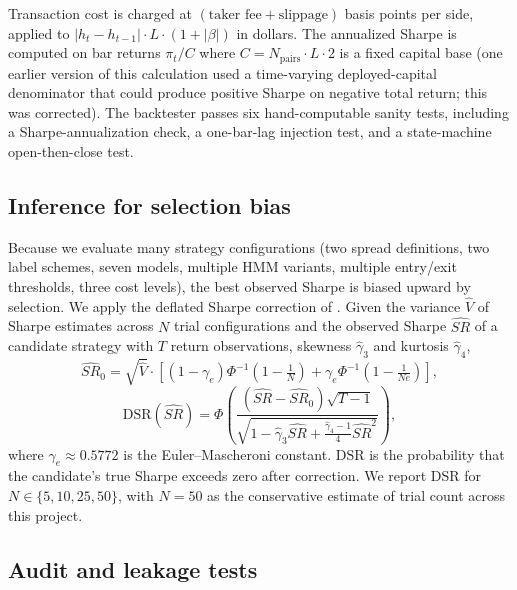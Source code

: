 \documentclass[11pt]{article}
\begin{document}
Transaction cost is charged at $(\text{taker fee} + \text{slippage})$
basis points per side, applied to $|h_t - h_{t-1}| \cdot L \cdot (1 + |\beta|)$
in dollars. The annualized Sharpe is computed on bar returns
$\pi_t / C$ where $C = N_{\text{pairs}} \cdot L \cdot 2$ is a fixed
capital base (one earlier version of this calculation used a
time-varying deployed-capital denominator that could produce positive
Sharpe on negative total return; this was corrected). The backtester
passes six hand-computable sanity tests, including a Sharpe-annualization
check, a one-bar-lag injection test, and a state-machine
open-then-close test.

\subsection{Inference for selection bias}

Because we evaluate many strategy configurations (two spread
definitions, two label schemes, seven models, multiple HMM variants,
multiple entry/exit thresholds, three cost levels), the best
observed Sharpe is biased upward by selection. We apply the deflated
Sharpe correction of \citet{bailey2014dsr}. Given the variance
$\widehat{V}$ of Sharpe estimates across $N$ trial configurations and
the observed Sharpe $\widehat{SR}$ of a candidate strategy with
$T$ return observations, skewness $\widehat{\gamma}_3$ and kurtosis
$\widehat{\gamma}_4$,
\begin{equation}
    \widehat{SR}_0 = \sqrt{\widehat{V}} \cdot \left[
        (1 - \gamma_e) \Phi^{-1}\left(1 - \tfrac{1}{N}\right)
        + \gamma_e \Phi^{-1}\left(1 - \tfrac{1}{N e}\right) \right],
\end{equation}
\begin{equation}
    \text{DSR}(\widehat{SR}) = \Phi\left(
        \frac{(\widehat{SR} - \widehat{SR}_0)\sqrt{T-1}}
             {\sqrt{1 - \widehat{\gamma}_3 \widehat{SR}
                     + \tfrac{\widehat{\gamma}_4 - 1}{4} \widehat{SR}^2}}\right),
\end{equation}
where $\gamma_e \approx 0.5772$ is the Euler--Mascheroni constant.
$\text{DSR}$ is the probability that the candidate's true Sharpe
exceeds zero after correction. We report DSR for $N \in \{5, 10, 25,
50\}$, with $N = 50$ as the conservative estimate of trial count
across this project.

\subsection{Audit and leakage tests} \label{sec:audit}
\end{document}
